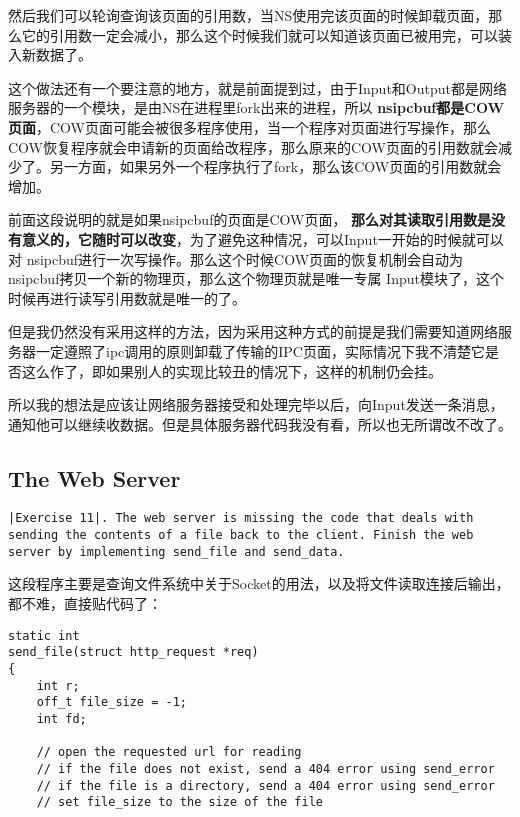 \documentclass{article}
\newcommand{\highlight}[1]{{\bfseries \color{red}  #1}}
\begin{document}
\begin{CJK*}{UTF8}{gkai}
然后我们可以轮询查询该页面的引用数，当NS使用完该页面的时候卸载页面，那么它的引用数一定会减小，那么这个时候我们就可以知道该页面已被用完，可以装入新数据了。

这个做法还有一个要注意的地方，就是前面提到过，由于Input和Output都是网络服务器的一个模块，是由NS在进程里fork出来的进程，所以\highlight{nsipcbuf都是COW页面}，COW页面可能会被很多程序使用，当一个程序对页面进行写操作，那么COW恢复程序就会申请新的页面给改程序，那么原来的COW页面的引用数就会减少了。另一方面，如果另外一个程序执行了fork，那么该COW页面的引用数就会增加。

前面这段说明的就是如果nsipcbuf的页面是COW页面，\highlight{那么对其读取引用数是没有意义的，它随时可以改变}，为了避免这种情况，可以Input一开始的时候就可以对 nsipcbuf进行一次写操作。那么这个时候COW页面的恢复机制会自动为nsipcbuf拷贝一个新的物理页，那么这个物理页就是唯一专属 Input模块了，这个时候再进行读写引用数就是唯一的了。

但是我仍然没有采用这样的方法，因为采用这种方式的前提是我们需要知道网络服务器一定遵照了ipc调用的原则卸载了传输的IPC页面，实际情况下我不清楚它是否这么作了，即如果别人的实现比较丑的情况下，这样的机制仍会挂。

所以我的想法是应该让网络服务器接受和处理完毕以后，向Input发送一条消息，通知他可以继续收数据。但是具体服务器代码我没有看，所以也无所谓改不改了。


\subsection{The Web Server}

\begin{lstlisting}[style=exercise]
|Exercise 11|. The web server is missing the code that deals with sending the contents of a file back to the client. Finish the web server by implementing send_file and send_data.
\end{lstlisting}

这段程序主要是查询文件系统中关于Socket的用法，以及将文件读取连接后输出，都不难，直接贴代码了：

\begin{lstlisting}[style=ccode, title={\scriptsize \ttfamily \bfseries user/httpd.c: send\_file()}]
static int
send_file(struct http_request *req)
{
	int r;
	off_t file_size = -1;
	int fd;

	// open the requested url for reading
	// if the file does not exist, send a 404 error using send_error
	// if the file is a directory, send a 404 error using send_error
	// set file_size to the size of the file


\end{lstlisting}
\end{CJK*}
\end{document}
